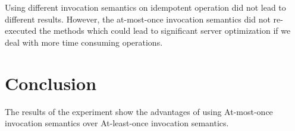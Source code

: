 \documentclass[12pt,a4paper]{article}
\begin{document}
Using different invocation semantics on idempotent operation did not lead to different results. However, the at-most-once invocation semantics did not re-executed the methods which could lead to significant server optimization if we deal with more time consuming  operations. 

\section{Conclusion}
The results of the experiment show the advantages of using At-most-once invocation semantics over At-least-once invocation semantics. 
\end{document}
